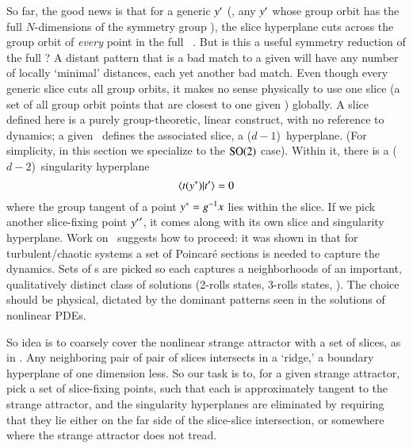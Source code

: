 


So far, the good news is that for a generic {\template} ${y'}$ (\ie,
any ${y'}$ whose group orbit has the full $N$-dimensions of the symmetry group
\Group), the slice hyperplane  cuts across the group orbit
of {\em every} point in the full \statesp\ \pS. But is this a useful
symmetry reduction of the full \statesp? A distant pattern that is a bad match
to a given {\template} will have any number of locally `minimal'
distances, each yet another bad match.
Even though every generic slice cuts all group orbits, it makes no sense
physically to use one slice (a set of all group orbit points that are
closest to one given {\template}) globally.
A slice
defined here is a purely group-theoretic, linear construct, with no
reference to dynamics; a given {\template} \slicep\ defines the
associated slice, a ($d\!-\!1$)\dmn\ hyperplane.
(For simplicity, in this section we specialize to the  $\textrm{SO}(2)$ case).
Within it, there is a
($d\!-\!2$)\dmn\ singularity hyperplane
\[
\braket{\groupTan(\sspRSing)}{\sliceTan{}}=0
\]
where the group tangent of a point $y^*=g^{-1} x$ lies within
the slice. If we pick another slice-fixing point ${y'}'$, it comes
along with its own slice and singularity hyperplane.
Work on \KS\ suggests how to
proceed: it was shown in
 that for
turbulent/chaotic systems a set of Poincar\'e sections is needed to
capture the dynamics. Sets of {\PoincSec}s are picked so each captures a
neighborhoods of an important, qualitatively distinct class of solutions
(2-rolls states, 3-rolls states, \etc). The choice should be physical,
dictated by the dominant patterns seen in the solutions of nonlinear
PDEs.

So idea is to
coarsely cover the nonlinear strange attractor with a set of slices,
as in . Any neighboring pair of pair of slices intersects in a
`ridge,' a
boundary hyperplane of one dimension less. So our task is to, for a
given strange attractor, pick a set of slice-fixing points, such that
each is approximately tangent to the strange attractor, and the
singularity hyperplanes are eliminated by requiring that they lie either
on the far side of the slice-slice intersection, or somewhere where
the strange attractor does not tread.

